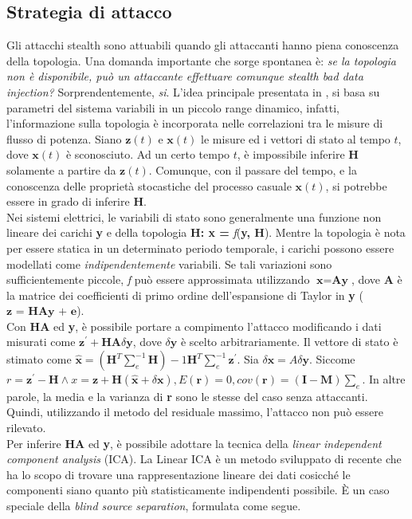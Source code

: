 \subsection{Strategia di attacco}
Gli attacchi stealth sono attuabili quando gli attaccanti hanno piena conoscenza della topologia. Una domanda importante che sorge spontanea è: \textit{se la topologia non è disponibile, può un attaccante effettuare comunque stealth bad data injection?} Sorprendentemente, \textit{si}. L'idea principale presentata in \cite{esmalifalak}, si basa su parametri del sistema variabili in un piccolo range dinamico, infatti, l'informazione sulla topologia è incorporata nelle correlazioni tra le misure di flusso di potenza. Siano $\textbf{z}(t)$ e $\textbf{x}(t)$ le misure ed i vettori di stato al tempo $t$, dove $\textbf{x}(t)$ è sconosciuto. Ad un certo tempo $t$, è impossibile inferire $\textbf{H}$ solamente a partire da $\textbf{z}(t)$. Comunque, con il passare del tempo, e la conoscenza delle proprietà stocastiche del processo casuale $\textbf{x}(t)$, si potrebbe essere in grado di inferire \textbf{H}.\\
Nei sistemi elettrici, le variabili di stato sono generalmente una funzione non lineare dei carichi \textbf{y} e della topologia \textbf{H: x = } \emph{f}(\textbf{y, H}). Mentre la topologia è nota per essere statica in un determinato periodo temporale, i carichi possono essere modellati come \textit{indipendentemente} variabili. Se tali variazioni sono sufficientemente piccole, \emph{f} può essere approssimata utilizzando $\textbf{x} = \textbf{Ay}$, dove \textbf{A} è la matrice dei coefficienti di primo ordine dell'espansione di Taylor in \textbf{y} ($\textbf{z = HAy + e}$).\\
Con \textbf{HA} ed \textbf{y}, è possibile portare a compimento l'attacco modificando i dati misurati come $\textbf{z}^\prime + \textbf{HA}\delta\textbf{y}$, dove $\delta\textbf{y}$ è scelto arbitrariamente. 
Il vettore di stato è stimato come $\widehat{\textbf{x}} = (\textbf{H}^T\sum_e^{-1}\textbf{H})-1\textbf{H}^T\sum_e^{-1}\textbf{z}^\prime$. Sia $\delta\textbf{x} = A\delta\textbf{y}$. Siccome $r = \textbf{z}^\prime - \textbf{H}\wedge x = \textbf{z} + \textbf{H}(\widehat{\textbf{x}} + \delta\textbf{x}), E(\textbf{r}) = 0, cov(\textbf{r}) = (\textbf{I} - \textbf{M})\sum_e$. In altre parole, la media e la varianza di \textbf{r} sono le stesse del caso senza attaccanti. Quindi, utilizzando il metodo del residuale massimo, l'attacco non può essere rilevato.\\
Per inferire \textbf{HA} ed \textbf{y}, è possibile adottare la tecnica della \emph{linear independent component analysis} (ICA). La Linear ICA \cite{lica} è un metodo sviluppato di recente che ha lo scopo di trovare una rappresentazione lineare dei dati cosicché le componenti siano quanto più statisticamente indipendenti possibile. È un caso speciale della \emph{blind source separation}, formulata come segue.
